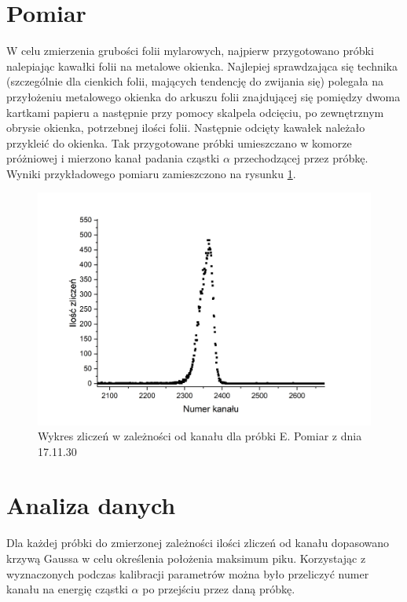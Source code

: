 \documentclass[12pt,a4paper]{article}
\begin{document}
\section{Pomiar}

W celu zmierzenia grubości folii mylarowych, najpierw przygotowano próbki nalepiając kawałki folii na metalowe okienka. Najlepiej sprawdzająca się technika (szczególnie dla cienkich folii, mających tendencję do zwijania się) polegała na przyłożeniu metalowego okienka do arkuszu folii znajdującej się pomiędzy dwoma kartkami papieru a następnie przy pomocy skalpela odcięciu, po zewnętrznym obrysie okienka, potrzebnej ilości folii. Następnie odcięty kawałek należało przykleić do okienka. Tak przygotowane próbki umieszczano w komorze próżniowej i mierzono kanał padania cząstki $\alpha$ przechodzącej przez próbkę. Wyniki przykładowego pomiaru zamieszczono na rysunku \ref{przykladowy_pomiar}.




\begin{figure}[H]
\centering
\includegraphics[scale=0.5]{Enlarged.png}
\caption{Wykres zliczeń w zależności od kanału dla próbki E. Pomiar z dnia 17.11.30}
\label{przykladowy_pomiar}
\end{figure}


\section{Analiza danych}
Dla każdej próbki do zmierzonej zależności ilości zliczeń od kanału dopasowano krzywą Gaussa w celu określenia położenia maksimum piku. Korzystając z wyznaczonych podczas kalibracji parametrów można było przeliczyć numer kanału na energię cząstki $\alpha$ po przejściu przez daną próbkę. 
\end{document}
